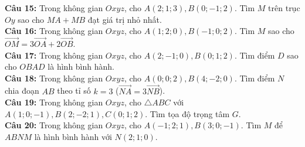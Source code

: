 \documentclass[12pt]{article}
\begin{document}
\begin{btvang}
		\noindent \textbf{Câu 15:} Trong không gian $Oxyz$, cho $A(2; 1; 3), B(0; -1; 2)$. Tìm $M$ trên trục $Oy$ sao cho $MA + MB$ đạt giá trị nhỏ nhất. \\
		\noindent \textbf{Câu 16:} Trong không gian $Oxyz$, cho $A(1; 2; 0), B(-1; 0; 2)$. Tìm $M$ sao cho $\vec{OM} = 3\vec{OA} + 2\vec{OB}$. \\
		\noindent \textbf{Câu 17:} Trong không gian $Oxyz$, cho $A(2; -1; 0), B(0; 1; 2)$. Tìm điểm $D$ sao cho $OBAD$ là hình bình hành. \\
		\noindent \textbf{Câu 18:} Trong không gian $Oxyz$, cho $A(0; 0; 2), B(4; -2; 0)$. Tìm điểm $N$ chia đoạn $AB$ theo tỉ số $k=3$ ($\vec{NA} = 3\vec{NB}$). \\
		\noindent \textbf{Câu 19:} Trong không gian $Oxyz$, cho $\triangle ABC$ với $A(1; 0; -1), B(2; -2; 1), C(0; 1; 2)$. Tìm tọa độ trọng tâm $G$. \\
		\noindent \textbf{Câu 20:} Trong không gian $Oxyz$, cho $A(-1; 2; 1), B(3; 0; -1)$. Tìm $M$ để $ABNM$ là hình bình hành với $N(2; 1; 0)$.
	\end{btvang}
	
\end{document}
